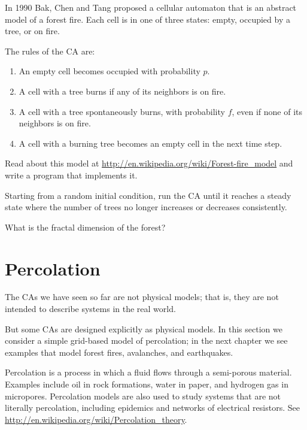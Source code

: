 \documentclass[10pt]{book}
\begin{document}
\begin{ex}

In 1990 Bak, Chen and Tang proposed a cellular automaton that is
an abstract model of a forest fire.  Each cell is in one of three
states: empty, occupied by a tree, or on fire.

The rules of the CA are:

\begin{enumerate}

\item An empty cell becomes occupied with probability $p$.

\item A cell with a tree burns if any of its neighbors
  is on fire.

\item A cell with a tree spontaneously burns, with
  probability $f$, even if none of its neighbors is on fire.

\item A cell with a burning tree becomes an empty cell in the next
  time step.

\end{enumerate}

Read about this model at
\url{http://en.wikipedia.org/wiki/Forest-fire_model} and write a program
that implements it.  

Starting from a random initial condition, run the CA until it reaches
a steady state where the number of trees no longer increases or
decreases consistently.

What is the fractal dimension of the forest?
 
\end{ex}


\section{Percolation}

The CAs we have seen so far are not physical models; that is, they are
not intended to describe systems in the real world.

But some CAs are designed explicitly as physical models.  In this
section we consider a simple grid-based model of percolation;
in the next chapter we see examples that model forest fires,
avalanches, and earthquakes.

Percolation is a process in which a fluid flows through a semi-porous
material.  Examples include oil in rock formations, water in paper,
and hydrogen gas in micropores.  Percolation models are also used to
study systems that are not literally percolation, including epidemics
and networks of electrical resistors.  See
\url{http://en.wikipedia.org/wiki/Percolation_theory}.
\end{document}
